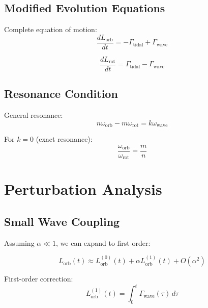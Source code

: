 \documentclass[12pt,a4paper]{article}
\begin{document}
\subsection{Modified Evolution Equations}

Complete equation of motion:
\begin{equation}
\frac{dL_{\text{orb}}}{dt} = -\Gamma_{\text{tidal}} + \Gamma_{\text{wave}}
\label{eq:modified_evolution}
\end{equation}

\begin{equation}
\frac{dL_{\text{rot}}}{dt} = \Gamma_{\text{tidal}} - \Gamma_{\text{wave}}
\label{eq:modified_rotation}
\end{equation}

\subsection{Resonance Condition}

General resonance:
\begin{equation}
n\omega_{\text{orb}} - m\omega_{\text{rot}} = k\omega_{\text{wave}}
\label{eq:resonance}
\end{equation}

For $k=0$ (exact resonance):
\begin{equation}
\frac{\omega_{\text{orb}}}{\omega_{\text{rot}}} = \frac{m}{n}
\label{eq:exact_resonance}
\end{equation}

\section{Perturbation Analysis}

\subsection{Small Wave Coupling}

Assuming $\alpha \ll 1$, we can expand to first order:

\begin{equation}
L_{\text{orb}}(t) \approx L_{\text{orb}}^{(0)}(t) + \alpha L_{\text{orb}}^{(1)}(t) + O(\alpha^2)
\label{eq:perturbation_expansion}
\end{equation}

First-order correction:
\begin{equation}
L_{\text{orb}}^{(1)}(t) = \int_0^t \Gamma_{\text{wave}}(\tau) \, d\tau
\label{eq:first_order}
\end{equation}
\end{document}
